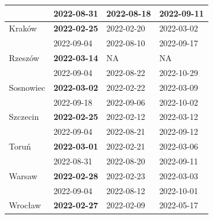 \documentclass[11pt]{article}
\begin{document}
\begin{table}[htbp]
{\begin{tabular}{llll}
            & 2022-08-31 & 2022-08-18 & 2022-09-11\\ \hline
Kraków      & \textbf{2022-02-25} & 2022-02-20 & 2022-03-02\\
            & 2022-09-04 & 2022-08-10 & 2022-09-17\\ \hline
Rzeszów     & \textbf{2022-03-14} & NA & NA\\
            & 2022-09-04 & 2022-08-22 & 2022-10-29\\ \hline
Sosnowiec   & \textbf{2022-03-02} & 2022-02-22 & 2022-03-09\\
            & 2022-09-18 & 2022-09-06 & 2022-10-02\\ \hline
Szczecin   & \textbf{2022-02-25} & 2022-02-12 & 2022-03-12\\
            & 2022-09-04 & 2022-08-21 & 2022-09-12\\ \hline
Toruń       & \textbf{2022-03-01} & 2022-02-21 & 2022-03-06\\
            & 2022-08-31 & 2022-08-20 & 2022-09-11\\ \hline
Warsaw      & \textbf{2022-02-28} & 2022-02-23 & 2022-03-03\\
            & 2022-09-04 & 2022-08-12 & 2022-10-01\\ \hline
Wrocław     & \textbf{2022-02-27} & 2022-02-09 & 2022-05-17\\ \hline
\bottomrule
\end{tabular}
}
\end{table}
\end{document}
